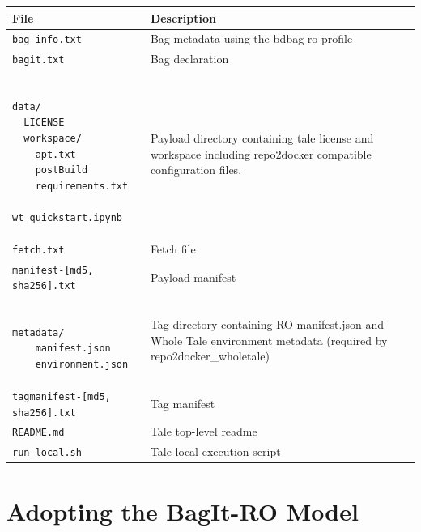 \documentclass[conference]{IEEEtran}
\begin{document}
\begin{center}
\begin{footnotesize}
\begin{tabular}{| p{4cm}|p{4cm} | } \hline
{\bf File} & {\bf Description}  \\ \hline
\texttt{bag-info.txt} & Bag metadata using the bdbag-ro-profile \\ \hline
\texttt{bagit.txt} & Bag declaration \\ \hline
\begin{minipage}{3in}
\begin{scriptsize}
\begin{verbatim}

data/
  LICENSE
  workspace/
    apt.txt
    postBuild
    requirements.txt
    wt_quickstart.ipynb
\end{verbatim}
\end{scriptsize}
\end{minipage} & Payload directory containing tale license and workspace including repo2docker compatible configuration files. \\ \hline
\texttt{fetch.txt} & Fetch file \\ \hline
\texttt{manifest-[md5, sha256].txt} & Payload manifest \\ \hline
\begin{minipage}{3in}
\begin{scriptsize}
\begin{verbatim}

metadata/
    manifest.json
    environment.json
\end{verbatim}
\end{scriptsize}
\end{minipage} &  Tag directory containing RO manifest.json and Whole Tale environment metadata  (required by repo2docker\_wholetale) \\ \hline
\texttt{tagmanifest-[md5, sha256].txt} & Tag manifest  \\ \hline
\texttt{README.md} & Tale top-level readme \\ \hline
\texttt{run-local.sh} & Tale local execution script \\ \hline
\end{tabular}
\end{footnotesize}
\end{center}






\section{Adopting the BagIt-RO Model}
\end{document}
